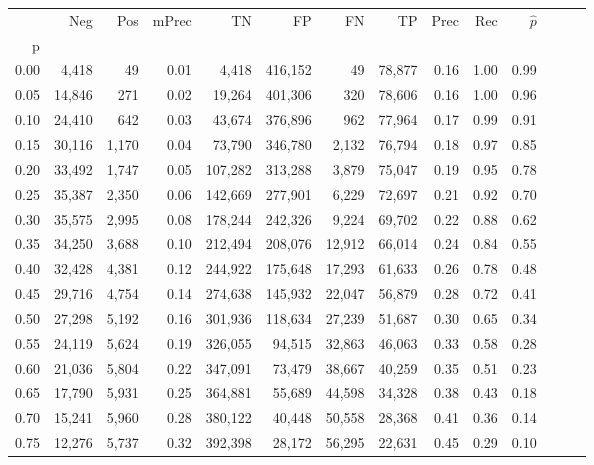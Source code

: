 \begin{tabular}{rrrrrrrrrrrrrr}
\toprule
{} &     Neg &    Pos & mPrec &       TN &       FP &      FN &      TP &  Prec &   Rec & $\hat{p}$ \\
p    &         &        &       &          &          &         &         &       &       &           \\
\midrule
0.00 &   4,418 &     49 &  0.01 &    4,418 &  416,152 &      49 &  78,877 &  0.16 &  1.00 &      0.99 \\
0.05 &  14,846 &    271 &  0.02 &   19,264 &  401,306 &     320 &  78,606 &  0.16 &  1.00 &      0.96 \\
0.10 &  24,410 &    642 &  0.03 &   43,674 &  376,896 &     962 &  77,964 &  0.17 &  0.99 &      0.91 \\
0.15 &  30,116 &  1,170 &  0.04 &   73,790 &  346,780 &   2,132 &  76,794 &  0.18 &  0.97 &      0.85 \\
0.20 &  33,492 &  1,747 &  0.05 &  107,282 &  313,288 &   3,879 &  75,047 &  0.19 &  0.95 &      0.78 \\
0.25 &  35,387 &  2,350 &  0.06 &  142,669 &  277,901 &   6,229 &  72,697 &  0.21 &  0.92 &      0.70 \\
0.30 &  35,575 &  2,995 &  0.08 &  178,244 &  242,326 &   9,224 &  69,702 &  0.22 &  0.88 &      0.62 \\
0.35 &  34,250 &  3,688 &  0.10 &  212,494 &  208,076 &  12,912 &  66,014 &  0.24 &  0.84 &      0.55 \\
0.40 &  32,428 &  4,381 &  0.12 &  244,922 &  175,648 &  17,293 &  61,633 &  0.26 &  0.78 &      0.48 \\
0.45 &  29,716 &  4,754 &  0.14 &  274,638 &  145,932 &  22,047 &  56,879 &  0.28 &  0.72 &      0.41 \\
0.50 &  27,298 &  5,192 &  0.16 &  301,936 &  118,634 &  27,239 &  51,687 &  0.30 &  0.65 &      0.34 \\
0.55 &  24,119 &  5,624 &  0.19 &  326,055 &   94,515 &  32,863 &  46,063 &  0.33 &  0.58 &      0.28 \\
0.60 &  21,036 &  5,804 &  0.22 &  347,091 &   73,479 &  38,667 &  40,259 &  0.35 &  0.51 &      0.23 \\
0.65 &  17,790 &  5,931 &  0.25 &  364,881 &   55,689 &  44,598 &  34,328 &  0.38 &  0.43 &      0.18 \\
0.70 &  15,241 &  5,960 &  0.28 &  380,122 &   40,448 &  50,558 &  28,368 &  0.41 &  0.36 &      0.14 \\
0.75 &  12,276 &  5,737 &  0.32 &  392,398 &   28,172 &  56,295 &  22,631 &  0.45 &  0.29 &      0.10 \\

\end{tabular}
